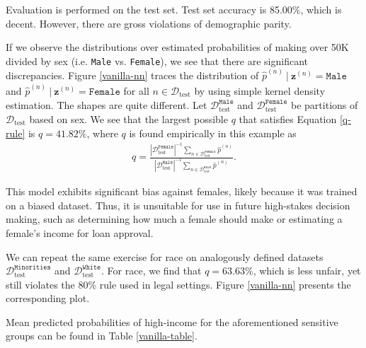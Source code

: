 \documentclass{article}
\newcommand\given[1][]{\:#1\vert\:}
\newcommand{\bd}[1]{\boldsymbol{#1}}
\newcommand{\hp}{\hat{p}}
\newcommand{\idx}[3][]{{#2}^{(#3)}_{#1}}
\newcommand{\bidx}[3][]{\bd{#2}^{(#3)}_{#1}}
\begin{document}
Evaluation is performed on the test set.  Test set accuracy is 85.00\%, which is decent.  However, there are gross violations of demographic parity.  

If we observe the distributions over estimated probabilities of making over 50K divided by sex (i.e. \texttt{Male} vs. \texttt{Female}), we see that there are significant discrepancies.  Figure \ref{vanilla-nn} traces the distribution of $\idx \hp n \given \bidx z n = \texttt{Male}$ and $\idx \hp n \given \bidx z n = \texttt{Female}$ for all $n \in \mathcal{D}_\text{test}$ by using simple kernel density estimation.  The shapes are quite different.  Let $\mathcal{D}_\text{test}^\texttt{Male}$ and $\mathcal{D}_\text{test}^\texttt{Female}$ be partitions of $\mathcal{D}_\text{test}$ based on sex.  We see that the largest possible $q$ that satisfies Equation \ref{q-rule} is $q = 41.82\%$, where $q$ is found empirically in this example as 
\begin{align}
q = \frac{| \mathcal{D}_\text{test}^\texttt{Female} |^{-1} \sum_{n \in \mathcal{D}_\text{test}^\texttt{Female}} \idx \hp n}{| \mathcal{D}_\text{test}^\texttt{Male} |^{-1} \sum_{n \in \mathcal{D}_\text{test}^\texttt{Male}} \idx \hp n}.
\end{align} 

This model exhibits significant bias against females, likely because it was trained on a biased dataset.  Thus, it is unsuitable for use in future high-stakes decision making, such as determining how much a female should make or estimating a female's income for loan approval. 

We can repeat the same exercise for race on analogously defined datasets $\mathcal{D}_\text{test}^\texttt{Minorities}$ and $\mathcal{D}_\text{test}^\texttt{White}$.  For race, we find that $q = 63.63\%$, which is less unfair, yet still violates the 80\% rule used in legal settings.  Figure \ref{vanilla-nn} presents the corresponding plot.

Mean predicted probabilities of high-income for the aforementioned sensitive groups can be found in Table \ref{vanilla-table}.
\end{document}
